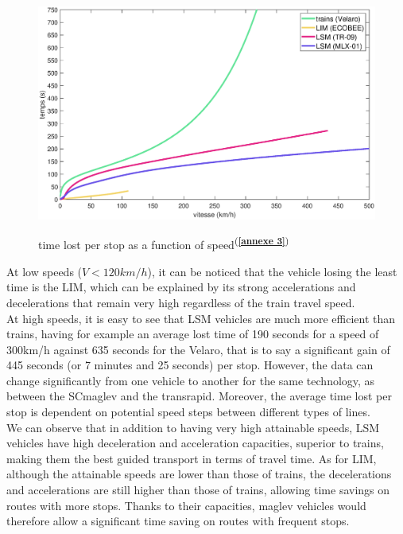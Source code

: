 \documentclass[12pt, a4paper, onecolumn]{article}
\renewcommand{\tab}{\tabto{15px}}
\newcommand{\cfannexe}[1]{\textsuperscript{(\textcolor{blue}{\textbf{\ref{annexe #1}}})}}
\begin{document}
\begin{figure}[H]
  \centering
  \scalebox{0.48}
  {\includegraphics{./fig/TP.eps}}
  \label{temps perdu}
  \caption{time lost per stop as a function of speed\cfannexe{3}}
\end{figure}



\pagebreak %
\tab At low speeds ($V<120 km/h$), it can be noticed that the vehicle losing the least time is the LIM, which can be explained by its strong accelerations and decelerations that remain very high regardless of the train travel speed. \\
\linebreak
\tab At high speeds, it is easy to see that LSM vehicles are much more efficient than trains, having for example an average lost time of 190 seconds for a speed of 300km/h against 635 seconds for the Velaro, that is to say a significant gain of 445 seconds (or 7 minutes and 25 seconds) per stop.
However, the data can change significantly from one vehicle to another for the same technology, as between the SCmaglev and the transrapid.
Moreover, the average time lost per stop is dependent on potential speed steps between different types of lines. \\
\linebreak
\tab We can observe that in addition to having very high attainable speeds, LSM vehicles have high deceleration and acceleration capacities, superior to trains, making them the best guided transport in terms of travel time.
As for LIM, although the attainable speeds are lower than those of trains, the decelerations and accelerations are still higher than those of trains, allowing time savings on routes with more stops.
Thanks to their capacities, maglev vehicles would therefore allow a significant time saving on routes with frequent stops. \\
\end{document}
